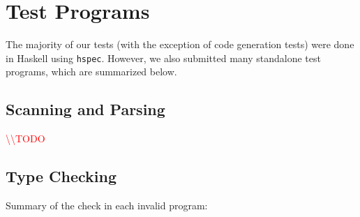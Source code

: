 \documentclass[11pt]{article}
\newcommand{\todo}[0]{\textcolor{red}{\textbackslash\textbackslash TODO \ }}
\begin{document}
\newpage

 

\newpage
\appendix
\section{Test Programs}
\label{sec:appendixa}

The majority of our tests (with the exception of code generation tests) were done in
Haskell using \texttt{hspec}. However, we also submitted many standalone test programs,
which are summarized below.

\subsection*{Scanning and Parsing}

\todo%

\subsection*{Type Checking}

Summary of the check in each invalid program:
\end{document}
